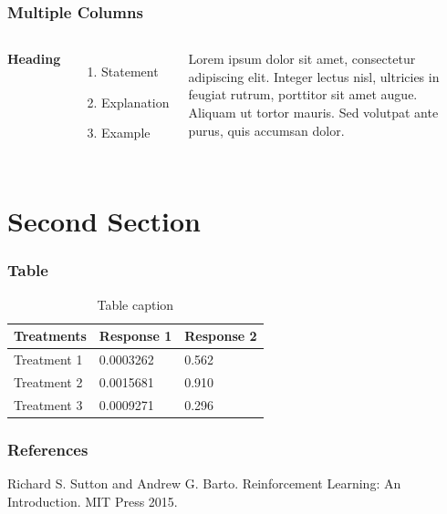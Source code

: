 \documentclass{beamer}
\begin{document}










\begin{frame}
\frametitle{Multiple Columns}
\begin{columns}[c] %

\textbf{Heading}
\begin{enumerate}
\item Statement
\item Explanation
\item Example
\end{enumerate}

Lorem ipsum dolor sit amet, consectetur adipiscing elit. Integer lectus nisl, ultricies in feugiat rutrum, porttitor sit amet augue. Aliquam ut tortor mauris. Sed volutpat ante purus, quis accumsan dolor.

\end{columns}
\end{frame}

\section{Second Section}

\begin{frame}
\frametitle{Table}
\begin{table}
\begin{tabular}{l l l}
\toprule
\textbf{Treatments} & \textbf{Response 1} & \textbf{Response 2}\\
\midrule
Treatment 1 & 0.0003262 & 0.562 \\
Treatment 2 & 0.0015681 & 0.910 \\
Treatment 3 & 0.0009271 & 0.296 \\
\bottomrule
\end{tabular}
\caption{Table caption}
\end{table}
\end{frame}




\begin{frame}
\frametitle{References}

Richard S. Sutton and Andrew G. Barto. Reinforcement Learning: An Introduction. MIT Press 2015.

\end{frame}

\end{document}

